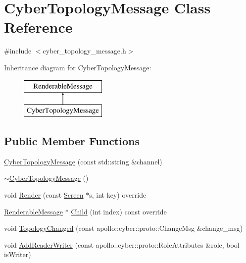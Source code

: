 \hypertarget{classCyberTopologyMessage}{\section{Cyber\-Topology\-Message Class Reference}
\label{classCyberTopologyMessage}
}


{\ttfamily \#include $<$cyber\-\_\-topology\-\_\-message.\-h$>$}

Inheritance diagram for Cyber\-Topology\-Message\-:\begin{figure}[H]
\begin{center}
\leavevmode
\includegraphics[height=2.000000cm]{classCyberTopologyMessage}
\end{center}
\end{figure}
\subsection*{Public Member Functions}
\begin{DoxyCompactItemize}
\item 
\hyperlink{classCyberTopologyMessage_ad29cc7035f525cb12cf25f0925656f74}{Cyber\-Topology\-Message} (const std\-::string \&channel)
\item 
\hyperlink{classCyberTopologyMessage_a79e7cc8a9ae14ac907c987131f86153e}{$\sim$\-Cyber\-Topology\-Message} ()
\item 
void \hyperlink{classCyberTopologyMessage_aed410d8532bc9230d35f61cebcee4824}{Render} (const \hyperlink{classScreen}{Screen} $\ast$s, int key) override
\item 
\hyperlink{classRenderableMessage}{Renderable\-Message} $\ast$ \hyperlink{classCyberTopologyMessage_afc36cda612863d6a940bef1509f39f16}{Child} (int index) const override
\item 
void \hyperlink{classCyberTopologyMessage_aeb57388a8b56c68681ab48f8ea5e5ea7}{Topology\-Changed} (const apollo\-::cyber\-::proto\-::\-Change\-Msg \&change\-\_\-msg)
\item 
void \hyperlink{classCyberTopologyMessage_a7ebd8b12a5e56099a2aec1aac9c1825e}{Add\-Reader\-Writer} (const apollo\-::cyber\-::proto\-::\-Role\-Attributes \&role, bool is\-Writer)
\end{DoxyCompactItemize}
